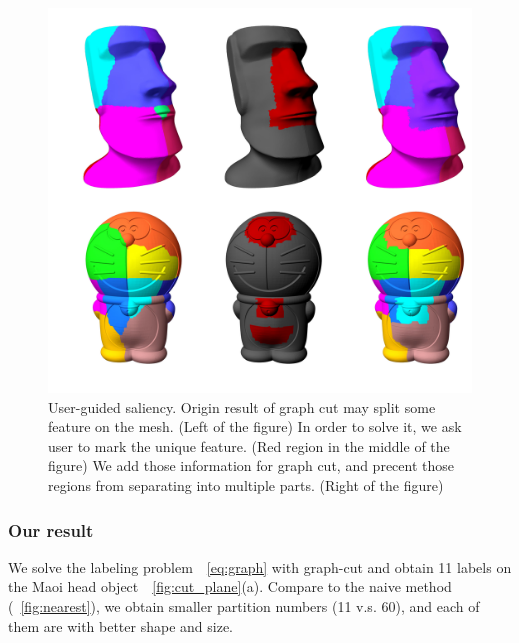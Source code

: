 \begin{figure}[ht]
\centering
\includegraphics[width=1.0\linewidth]{figs/saliency.pdf} 
\caption{User-guided saliency. 
Origin result of graph cut may split some feature on the mesh. (Left of the figure) In order to solve it, we ask user to mark the unique feature. (Red region in the middle of the figure) We add those information for graph cut, and precent those regions from separating into multiple parts. (Right of the figure)} 
\label{fig:saliency}
\end{figure}

\subsubsection{Our result}
We solve the labeling problem~\eqname~\ref{eq:graph} with graph-cut and obtain 11 labels on the Maoi head object~\figname~\ref{fig:cut_plane}(a).
Compare to the naive method (\figname~\ref{fig:nearest}), we obtain smaller partition numbers (11 v.s. 60), and each of them are with better shape and size.

